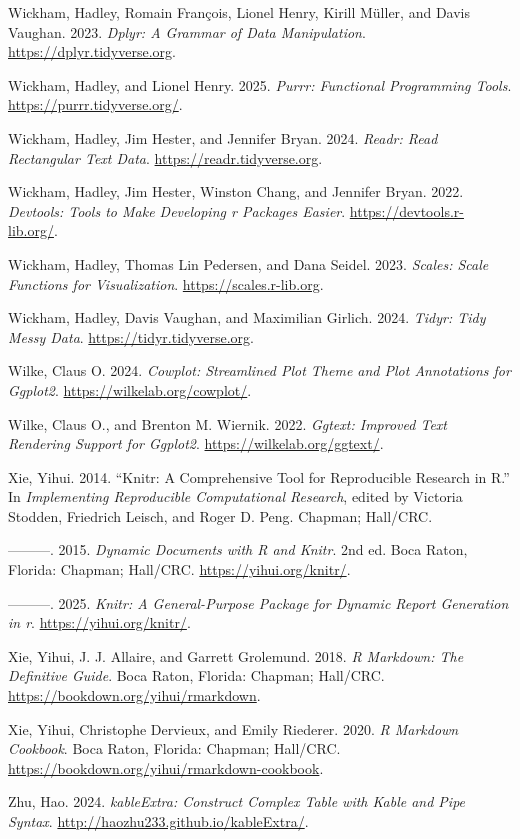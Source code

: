 \documentclass[
]{article}
\newlength{\cslhangindent}
\newenvironment{CSLReferences}[2] %
 {\begin{list}{}{%
  \setlength{\itemindent}{0pt}
  \setlength{\leftmargin}{0pt}
  \setlength{\parsep}{0pt}
  \ifodd #1
   \setlength{\leftmargin}{\cslhangindent}
   \setlength{\itemindent}{-1\cslhangindent}
  \fi
  \setlength{\itemsep}{#2\baselineskip}}}
 {\end{list}}
\begin{document}
\begin{CSLReferences}{1}{0}
Wickham, Hadley, Romain François, Lionel Henry, Kirill Müller, and Davis
Vaughan. 2023. \emph{Dplyr: A Grammar of Data Manipulation}.
\url{https://dplyr.tidyverse.org}.

Wickham, Hadley, and Lionel Henry. 2025. \emph{Purrr: Functional
Programming Tools}. \url{https://purrr.tidyverse.org/}.

Wickham, Hadley, Jim Hester, and Jennifer Bryan. 2024. \emph{Readr: Read
Rectangular Text Data}. \url{https://readr.tidyverse.org}.

Wickham, Hadley, Jim Hester, Winston Chang, and Jennifer Bryan. 2022.
\emph{Devtools: Tools to Make Developing r Packages Easier}.
\url{https://devtools.r-lib.org/}.

Wickham, Hadley, Thomas Lin Pedersen, and Dana Seidel. 2023.
\emph{Scales: Scale Functions for Visualization}.
\url{https://scales.r-lib.org}.

Wickham, Hadley, Davis Vaughan, and Maximilian Girlich. 2024.
\emph{Tidyr: Tidy Messy Data}. \url{https://tidyr.tidyverse.org}.

Wilke, Claus O. 2024. \emph{Cowplot: Streamlined Plot Theme and Plot
Annotations for Ggplot2}. \url{https://wilkelab.org/cowplot/}.

Wilke, Claus O., and Brenton M. Wiernik. 2022. \emph{Ggtext: Improved
Text Rendering Support for Ggplot2}. \url{https://wilkelab.org/ggtext/}.

Xie, Yihui. 2014. {``Knitr: A Comprehensive Tool for Reproducible
Research in {R}.''} In \emph{Implementing Reproducible Computational
Research}, edited by Victoria Stodden, Friedrich Leisch, and Roger D.
Peng. Chapman; Hall/CRC.

---------. 2015. \emph{Dynamic Documents with {R} and Knitr}. 2nd ed.
Boca Raton, Florida: Chapman; Hall/CRC. \url{https://yihui.org/knitr/}.

---------. 2025. \emph{Knitr: A General-Purpose Package for Dynamic
Report Generation in r}. \url{https://yihui.org/knitr/}.

Xie, Yihui, J. J. Allaire, and Garrett Grolemund. 2018. \emph{R
Markdown: The Definitive Guide}. Boca Raton, Florida: Chapman; Hall/CRC.
\url{https://bookdown.org/yihui/rmarkdown}.

Xie, Yihui, Christophe Dervieux, and Emily Riederer. 2020. \emph{R
Markdown Cookbook}. Boca Raton, Florida: Chapman; Hall/CRC.
\url{https://bookdown.org/yihui/rmarkdown-cookbook}.

Zhu, Hao. 2024. \emph{kableExtra: Construct Complex Table with Kable and
Pipe Syntax}. \url{http://haozhu233.github.io/kableExtra/}.

\end{CSLReferences}
\end{document}

